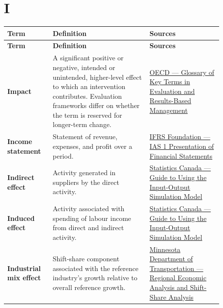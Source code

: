 \documentclass[11pt,letterpaper,oneside,openany]{book}
\begin{document}
\section[I]{I}
\begin{center}
\small
\setlength{\LTpre}{0.4em}
\setlength{\LTpost}{0.8em}
\begin{longtable}{>{\RaggedRight\arraybackslash}p{0.180\linewidth}>{\RaggedRight\arraybackslash}p{0.400\linewidth}>{\RaggedRight\arraybackslash}p{0.300\linewidth}}
\rowcolor{DeepNavy}
\color{white}\bfseries Term & \color{white}\bfseries Definition & \color{white}\bfseries Sources \\
\endfirsthead
\rowcolor{DeepNavy}
\color{white}\bfseries Term & \color{white}\bfseries Definition & \color{white}\bfseries Sources \\
\endhead
\textbf{Impact} & A significant positive or negative, intended or unintended, higher-level effect to which an intervention contributes. Evaluation frameworks differ on whether the term is reserved for longer-term change. & \href{https://www.oecd.org/en/publications/glossary-of-key-terms-in-evaluation-and-results-based-management-for-sustainable-development-second-edition\_632da462-en-fr-es.html}{OECD --- Glossary of Key Terms in Evaluation and Results-Based Management} \\
\textbf{Income statement} & Statement of revenue, expenses, and profit over a period. & \href{https://www.ifrs.org/issued-standards/list-of-standards/ias-1-presentation-of-financial-statements.html/}{IFRS Foundation --- IAS 1 Presentation of Financial Statements} \\
\textbf{Indirect effect} & Activity generated in suppliers by the direct activity. & \href{https://www.statcan.gc.ca/en/statistical-programs/document/5115\_D6\_T9\_V1}{Statistics Canada --- Guide to Using the Input-Output Simulation Model} \\
\textbf{Induced effect} & Activity associated with spending of labour income from direct and indirect activity. & \href{https://www.statcan.gc.ca/en/statistical-programs/document/5115\_D6\_T9\_V1}{Statistics Canada --- Guide to Using the Input-Output Simulation Model} \\
\textbf{Industrial mix effect} & Shift-share component associated with the reference industry's growth relative to overall reference growth. & \href{https://www.dot.mn.gov/ofrw/freight/PDF/d1plan/wp2.pdf}{Minnesota Department of Transportation --- Regional Economic Analysis and Shift-Share Analysis} \\

\end{longtable}
\end{center}
\end{document}
